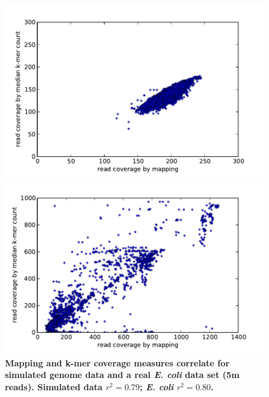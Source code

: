 \documentclass{pnastwo}
\begin{document}
\begin{figure}[!ht]
\begin{center}
\centerline{\includegraphics[width=5in]{diginorm-sim-genome.pdf}}
\centerline{\includegraphics[width=5in]{diginorm-ecoli-genome.pdf}}
\end{center}
\caption{
{\bf Mapping and k-mer coverage measures correlate for simulated genome
data and a real {\em E. coli} data set (5m reads).  Simulated data $r^2 = 0.79$; {\em
E. coli} $r^2 = 0.80$.}
}
\label{fig:random}
\end{figure}
\end{document}
